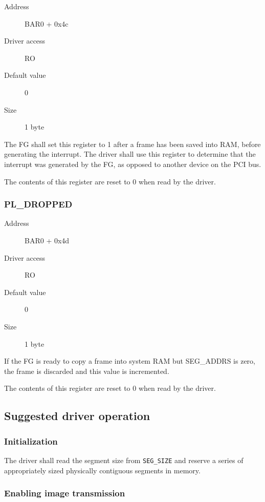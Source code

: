 \documentclass[12pt]{article}
\begin{document}
\begin{description}
\item[Address] BAR0 + 0x4c
\item[Driver access] RO
\item[Default value] 0
\item[Size] 1 byte
\end{description}

The FG shall set this register to 1 after a frame has been saved into RAM, before generating the interrupt. The driver shall use this register to determine that the interrupt was generated by the FG, as opposed to another device on the PCI bus.

The contents of this register are reset to 0 when read by the driver.

\subsubsection{PL\_DROPPED}

\begin{description}
\item[Address] BAR0 + 0x4d
\item[Driver access] RO
\item[Default value] 0
\item[Size] 1 byte
\end{description}

If the FG is ready to copy a frame into system RAM but SEG\_ADDRS is zero, the frame is discarded and this value is incremented.

The contents of this register are reset to 0 when read by the driver.

\subsection{Suggested driver operation}

\subsubsection{Initialization}

The driver shall read the segment size from \texttt{SEG\_SIZE} and reserve a series of appropriately sized physically contiguous segments in memory.

\subsubsection{Enabling image transmission}
\end{document}
